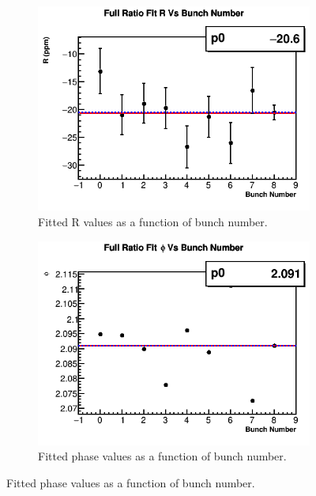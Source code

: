 		\begin{figure}[]
		\centering
		    \begin{subfigure}[t]{0.4\textwidth}
			    \centering
				\includegraphics[width=\textwidth]{RatioCBO_R_Vs_BunchNum_Canv}
			    \caption{Fitted R values as a function of bunch number.}
		    \end{subfigure}
		    \hspace{4mm}
		    \begin{subfigure}[t]{0.4\textwidth}
			    \centering
				\includegraphics[width=\textwidth]{RatioCBO_phi_Vs_BunchNum_Canv}
			    \caption{Fitted \gmtwo phase values as a function of bunch number.}
			    \label{SubFig:gm2PhaseBunch}
		    \end{subfigure}%

\end{figure}
